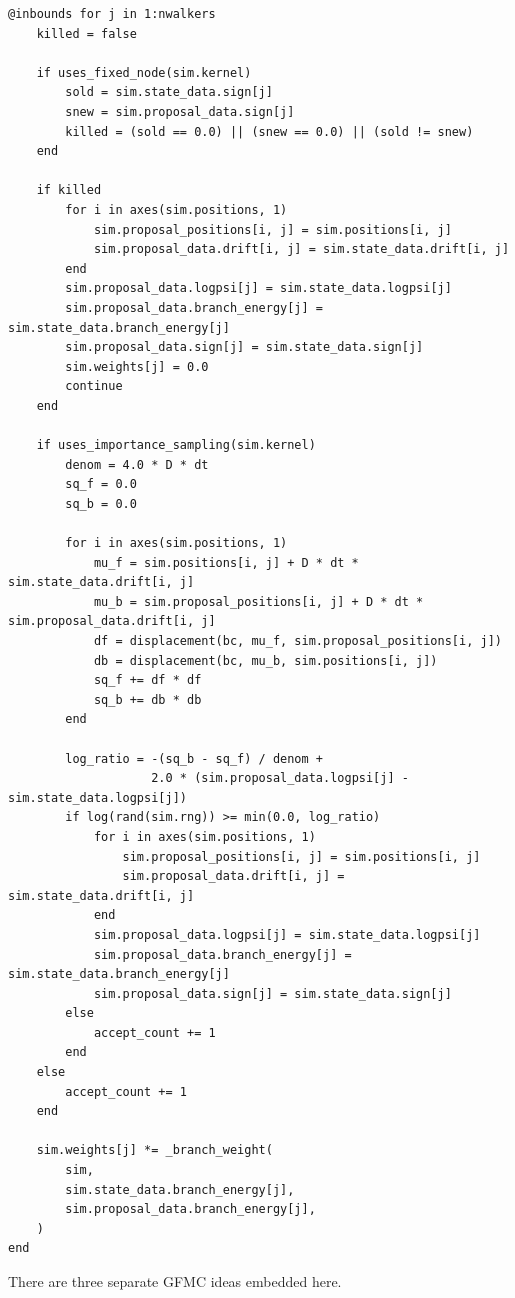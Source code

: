 \documentclass[11pt]{article}
\newcommand{\code}[1]{\texttt{\detokenize{#1}}}
\begin{document}
\begin{lstlisting}[style=codeblock,caption={Walker update logic in \code{src/UseCases/gfmc/run.jl}}]
@inbounds for j in 1:nwalkers
    killed = false

    if uses_fixed_node(sim.kernel)
        sold = sim.state_data.sign[j]
        snew = sim.proposal_data.sign[j]
        killed = (sold == 0.0) || (snew == 0.0) || (sold != snew)
    end

    if killed
        for i in axes(sim.positions, 1)
            sim.proposal_positions[i, j] = sim.positions[i, j]
            sim.proposal_data.drift[i, j] = sim.state_data.drift[i, j]
        end
        sim.proposal_data.logpsi[j] = sim.state_data.logpsi[j]
        sim.proposal_data.branch_energy[j] = sim.state_data.branch_energy[j]
        sim.proposal_data.sign[j] = sim.state_data.sign[j]
        sim.weights[j] = 0.0
        continue
    end

    if uses_importance_sampling(sim.kernel)
        denom = 4.0 * D * dt
        sq_f = 0.0
        sq_b = 0.0

        for i in axes(sim.positions, 1)
            mu_f = sim.positions[i, j] + D * dt * sim.state_data.drift[i, j]
            mu_b = sim.proposal_positions[i, j] + D * dt * sim.proposal_data.drift[i, j]
            df = displacement(bc, mu_f, sim.proposal_positions[i, j])
            db = displacement(bc, mu_b, sim.positions[i, j])
            sq_f += df * df
            sq_b += db * db
        end

        log_ratio = -(sq_b - sq_f) / denom +
                    2.0 * (sim.proposal_data.logpsi[j] - sim.state_data.logpsi[j])
        if log(rand(sim.rng)) >= min(0.0, log_ratio)
            for i in axes(sim.positions, 1)
                sim.proposal_positions[i, j] = sim.positions[i, j]
                sim.proposal_data.drift[i, j] = sim.state_data.drift[i, j]
            end
            sim.proposal_data.logpsi[j] = sim.state_data.logpsi[j]
            sim.proposal_data.branch_energy[j] = sim.state_data.branch_energy[j]
            sim.proposal_data.sign[j] = sim.state_data.sign[j]
        else
            accept_count += 1
        end
    else
        accept_count += 1
    end

    sim.weights[j] *= _branch_weight(
        sim,
        sim.state_data.branch_energy[j],
        sim.proposal_data.branch_energy[j],
    )
end
\end{lstlisting}

There are three separate GFMC ideas embedded here.
\end{document}
